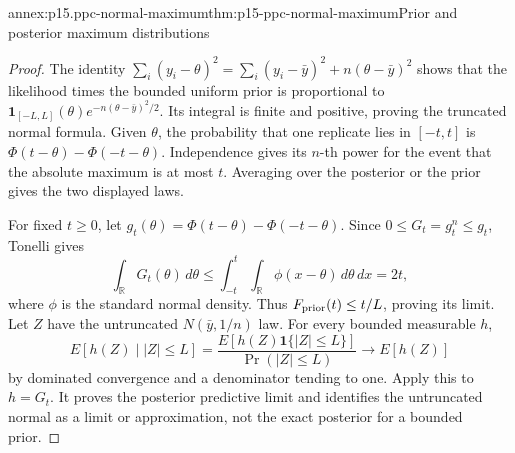 \begin{annexitem}{annex:p15.ppc-normal-maximum}{thm:p15-ppc-normal-maximum}{Prior and posterior maximum distributions}
\begin{proof}
The identity
\(\sum_i(y_i-\theta)^2=\sum_i(y_i-\bar y)^2+n(\theta-\bar y)^2\)
shows that the likelihood times the bounded uniform prior is proportional
to \(\mathbf1_{[-L,L]}(\theta)e^{-n(\theta-\bar y)^2/2}\).
Its integral is finite and positive, proving the truncated normal formula.
Given \(\theta\), the probability that one replicate lies in \([-t,t]\)
is \(\Phi(t-\theta)-\Phi(-t-\theta)\). Independence gives its
\(n\)-th power for the event that the absolute maximum is at most \(t\).
Averaging over the posterior or the prior gives the two displayed laws.

For fixed \(t\geq0\), let
\(g_t(\theta)=\Phi(t-\theta)-\Phi(-t-\theta)\). Since
\(0\leq G_t=g_t^n\leq g_t\), Tonelli gives
\[
 \int_{\mathbb R}G_t(\theta)\,d\theta
 \leq\int_{-t}^t\int_{\mathbb R}\phi(x-\theta)\,d\theta\,dx=2t,
\]
where \(\phi\) is the standard normal density. Thus
\(F_{\rm prior}(t)\leq t/L\), proving its limit. Let \(Z\) have
the untruncated \(N(\bar y,1/n)\) law. For every bounded measurable
\(h\),
\[
 E[h(Z)\mid |Z|\leq L]
 =\frac{E[h(Z)\mathbf1\{|Z|\leq L\}]}{\Pr(|Z|\leq L)}
 \longrightarrow E[h(Z)]
\]
by dominated convergence and a denominator tending to one. Apply this
to \(h=G_t\). It proves the posterior predictive limit and identifies
the untruncated normal as a limit or approximation, not the exact posterior
for a bounded prior.
\end{proof}
\end{annexitem}
